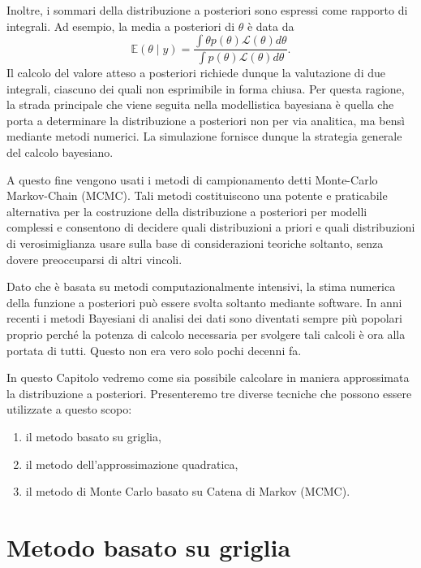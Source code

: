 \documentclass[
]{memoir}
\providecommand{\tightlist}{%
  \setlength{\itemsep}{0pt}\setlength{\parskip}{0pt}}
\begin{document}
Inoltre, i sommari della distribuzione a posteriori sono espressi come rapporto di integrali. Ad esempio, la media a posteriori di \(\theta\) è data da
\begin{equation}
\mathbb{E}(\theta \mid y) = \frac{\int \theta p(\theta) \mathcal{L}(\theta) d \theta}{\int p(\theta) \mathcal{L}(\theta) d \theta}.
\end{equation}
Il calcolo del valore atteso a posteriori richiede dunque la valutazione di due integrali, ciascuno dei quali non esprimibile in forma chiusa. Per questa ragione, la strada principale che viene seguita nella modellistica bayesiana è quella che porta a determinare la distribuzione a posteriori non per via analitica, ma bensì mediante metodi numerici. La simulazione fornisce dunque la strategia generale del calcolo bayesiano.

A questo fine vengono usati i metodi di campionamento detti Monte-Carlo Markov-Chain (MCMC). Tali metodi costituiscono una potente e praticabile alternativa per la costruzione della distribuzione a posteriori per modelli complessi e consentono di decidere quali distribuzioni a priori e quali distribuzioni di verosimiglianza usare sulla base di considerazioni teoriche soltanto, senza dovere preoccuparsi di altri vincoli.

Dato che è basata su metodi computazionalmente intensivi, la stima numerica della funzione a posteriori può essere svolta soltanto mediante software. In anni recenti i metodi Bayesiani di analisi dei dati sono diventati sempre più popolari proprio perché la potenza di calcolo necessaria per svolgere tali calcoli è ora alla portata di tutti. Questo non era vero solo pochi decenni fa.

In questo Capitolo vedremo come sia possibile calcolare in maniera approssimata la distribuzione a posteriori. Presenteremo tre diverse tecniche che possono essere utilizzate a questo scopo:

\begin{enumerate}
\def\labelenumi{\arabic{enumi}.}
\tightlist
\item
  il metodo basato su griglia,
\item
  il metodo dell'approssimazione quadratica,
\item
  il metodo di Monte Carlo basato su Catena di Markov (MCMC).
\end{enumerate}

\hypertarget{metodo-basato-su-griglia}{%
\section{Metodo basato su griglia}\label{metodo-basato-su-griglia}}
\end{document}

